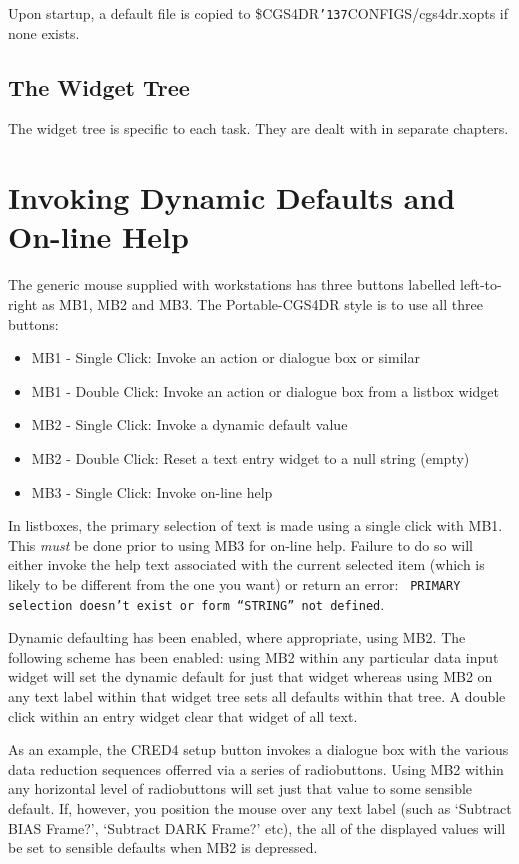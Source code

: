 \documentclass[a4paper]{book}
\renewcommand{\_}{{\tt\char'137}}
\begin{document}
Upon startup, a default file is copied to \$CGS4DR\_CONFIGS/cgs4dr.xopts if none exists.

\subsection{The Widget Tree}
The widget tree is specific to each task. They are dealt with in separate chapters.

\section{Invoking Dynamic Defaults and On-line Help}
The generic mouse supplied with workstations has three buttons labelled
left-to-right as MB1, MB2 and MB3. The Portable-CGS4DR style is to use
all three buttons:

\begin{itemize}
\item MB1 - Single Click: Invoke an action or dialogue box or similar
\item MB1 - Double Click: Invoke an action or dialogue box from a listbox widget
\item MB2 - Single Click: Invoke a dynamic default value
\item MB2 - Double Click: Reset a text entry widget to a null string (empty)
\item MB3 - Single Click: Invoke on-line help
\end{itemize}

In listboxes, the primary selection of text is made using a single click with MB1.
This {\em must} be done prior to using MB3 for on-line help. Failure to do so will
either invoke the help text associated with the current selected item (which is
likely to be different from the one you want) or return an error: {\tt
PRIMARY selection doesn't exist or form ``STRING'' not defined}.

Dynamic defaulting has been enabled, where appropriate, using MB2. The following
scheme has been enabled: using MB2 within any particular data input widget will set the
dynamic default for just that widget whereas using MB2 on any text label within
that widget tree sets all defaults within that tree. A double click within an entry
widget clear that widget of all text.

As an example, the CRED4 setup button invokes a dialogue box with the various
data reduction sequences offerred via a series of radiobuttons. Using MB2
within any horizontal level of radiobuttons will set just that value to some
sensible default. If, however, you position the mouse over any text label
(such as `Subtract BIAS Frame?', `Subtract DARK Frame?' etc), the all of the
displayed values will be set to sensible defaults when MB2 is depressed.
\end{document}
